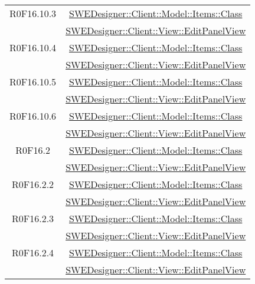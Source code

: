 \documentclass[../DefinizioneDiProdotto.tex]{subfiles}
\begin{document}
\begin{longtable}{|c|c|}
				R0F16.10.3
				& \hyperlink{SWEDesigner::Client::Model::Items::Class}{SWEDesigner::Client::Model::Items::Class}\\
				& \hyperlink{SWEDesigner::Client::View::EditPanelView}{SWEDesigner::Client::View::EditPanelView}\\
				\hline

				R0F16.10.4
				& \hyperlink{SWEDesigner::Client::Model::Items::Class}{SWEDesigner::Client::Model::Items::Class}\\
				& \hyperlink{SWEDesigner::Client::View::EditPanelView}{SWEDesigner::Client::View::EditPanelView}\\
				\hline

				R0F16.10.5
				& \hyperlink{SWEDesigner::Client::Model::Items::Class}{SWEDesigner::Client::Model::Items::Class}\\
				& \hyperlink{SWEDesigner::Client::View::EditPanelView}{SWEDesigner::Client::View::EditPanelView}\\
				\hline

				R0F16.10.6
				& \hyperlink{SWEDesigner::Client::Model::Items::Class}{SWEDesigner::Client::Model::Items::Class}\\
				& \hyperlink{SWEDesigner::Client::View::EditPanelView}{SWEDesigner::Client::View::EditPanelView}\\
				\hline

				R0F16.2
				& \hyperlink{SWEDesigner::Client::Model::Items::Class}{SWEDesigner::Client::Model::Items::Class}\\
				& \hyperlink{SWEDesigner::Client::View::EditPanelView}{SWEDesigner::Client::View::EditPanelView}\\
				\hline

				R0F16.2.2
				& \hyperlink{SWEDesigner::Client::Model::Items::Class}{SWEDesigner::Client::Model::Items::Class}\\
				& \hyperlink{SWEDesigner::Client::View::EditPanelView}{SWEDesigner::Client::View::EditPanelView}\\
				\hline

				R0F16.2.3
				& \hyperlink{SWEDesigner::Client::Model::Items::Class}{SWEDesigner::Client::Model::Items::Class}\\
				& \hyperlink{SWEDesigner::Client::View::EditPanelView}{SWEDesigner::Client::View::EditPanelView}\\
				\hline

				R0F16.2.4
				& \hyperlink{SWEDesigner::Client::Model::Items::Class}{SWEDesigner::Client::Model::Items::Class}\\
				& \hyperlink{SWEDesigner::Client::View::EditPanelView}{SWEDesigner::Client::View::EditPanelView}\\
				\hline


\end{longtable}
\end{document}
